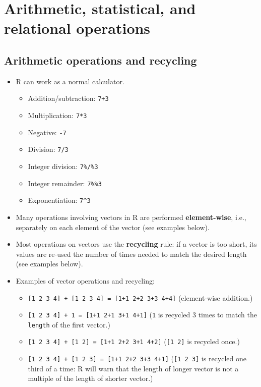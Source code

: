 \documentclass[
]{book}
\providecommand{\tightlist}{%
  \setlength{\itemsep}{0pt}\setlength{\parskip}{0pt}}
\begin{document}
\hypertarget{arithmetic-statistical-and-relational-operations}{%
\section{Arithmetic, statistical, and relational operations}\label{arithmetic-statistical-and-relational-operations}}

\hypertarget{arithmetic-operations-and-recycling}{%
\subsection{Arithmetic operations and recycling}\label{arithmetic-operations-and-recycling}}

\begin{itemize}
\tightlist
\item
  R can work as a normal calculator.

  \begin{itemize}
  \tightlist
  \item
    Addition/subtraction: \texttt{7+3}
  \item
    Multiplication: \texttt{7*3}
  \item
    Negative: \texttt{-7}
  \item
    Division: \texttt{7/3}
  \item
    Integer division: \texttt{7\%/\%3}
  \item
    Integer remainder: \texttt{7\%\%3}
  \item
    Exponentiation: \texttt{7\^{}3}
  \end{itemize}
\item
  Many operations involving vectors in R are performed \textbf{element-wise}, i.e., separately on each element of the vector (see examples below).
\item
  Most operations on vectors use the \textbf{recycling} rule: if a vector is too short, its values are re-used the number of times needed to match the desired length (see examples below).
\item
  Examples of vector operations and recycling:

  \begin{itemize}
  \tightlist
  \item
    \texttt{{[}1\ 2\ 3\ 4{]}\ +\ {[}1\ 2\ 3\ 4{]}\ =\ {[}1+1\ 2+2\ 3+3\ 4+4{]}} (element-wise addition.)
  \item
    \texttt{{[}1\ 2\ 3\ 4{]}\ +\ 1\ =\ {[}1+1\ 2+1\ 3+1\ 4+1{]}} (\texttt{1} is recycled 3 times to match the \texttt{length} of the first vector.)
  \item
    \texttt{{[}1\ 2\ 3\ 4{]}\ +\ {[}1\ 2{]}\ =\ {[}1+1\ 2+2\ 3+1\ 4+2{]}} (\texttt{{[}1\ 2{]}} is recycled once.)
  \item
    \texttt{{[}1\ 2\ 3\ 4{]}\ +\ {[}1\ 2\ 3{]}\ =\ {[}1+1\ 2+2\ 3+3\ 4+1{]}} (\texttt{{[}1\ 2\ 3{]}} is recycled one third of a time: R will warn that the length of longer vector is not a multiple of the length of shorter vector.)
  \end{itemize}
\end{itemize}
\end{document}
